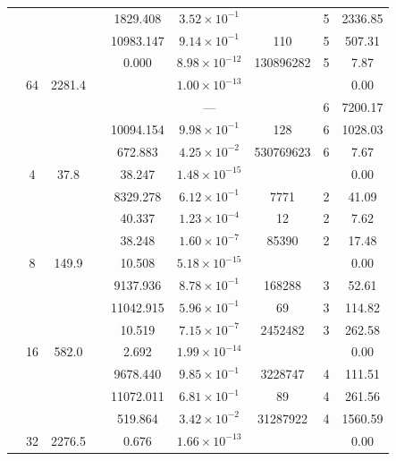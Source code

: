 \begin{table}[htbp]
\begin{tabular}{l S[table-format=3.0] S[table-format=4.1] l S[table-format=3.3] S[table-format=1.2e2] S[table-format=6.0] S[table-format=2.0] S[table-format=4.2]}
     &  &  &  & 1829.408 & $3.52 \times 10^{-1}$ & {\text{---}} & 5 & 2336.85 \\
     &  &  &  & 10983.147 & $9.14 \times 10^{-1}$ & 110 & 5 & 507.31 \\
     &  &  &  & 0.000 & $8.98 \times 10^{-12}$ & 130896282 & 5 & 7.87 \\
     & 64 & 2281.4 &  & {\text{---}} & $1.00 \times 10^{-13}$ & {\text{---}} & {\text{---}} & 0.00 \\
     &  &  &  & {\text{---}} & ${\text{---}}$ & {\text{---}} & 6 & 7200.17 \\
     &  &  &  & 10094.154 & $9.98 \times 10^{-1}$ & 128 & 6 & 1028.03 \\
     &  &  &  & 672.883 & $4.25 \times 10^{-2}$ & 530769623 & 6 & 7.67 \\
    \midrule
     & 4 & 37.8 &  & 38.247 & $1.48 \times 10^{-15}$ & {\text{---}} & {\text{---}} & 0.00 \\
     &  &  &  & 8329.278 & $6.12 \times 10^{-1}$ & 7771 & 2 & 41.09 \\
     &  &  &  & 40.337 & $1.23 \times 10^{-4}$ & 12 & 2 & 7.62 \\
     &  &  &  & 38.248 & $1.60 \times 10^{-7}$ & 85390 & 2 & 17.48 \\
     & 8 & 149.9 &  & 10.508 & $5.18 \times 10^{-15}$ & {\text{---}} & {\text{---}} & 0.00 \\
     &  &  &  & 9137.936 & $8.78 \times 10^{-1}$ & 168288 & 3 & 52.61 \\
     &  &  &  & 11042.915 & $5.96 \times 10^{-1}$ & 69 & 3 & 114.82 \\
     &  &  &  & 10.519 & $7.15 \times 10^{-7}$ & 2452482 & 3 & 262.58 \\
     & 16 & 582.0 &  & 2.692 & $1.99 \times 10^{-14}$ & {\text{---}} & {\text{---}} & 0.00 \\
     &  &  &  & 9678.440 & $9.85 \times 10^{-1}$ & 3228747 & 4 & 111.51 \\
     &  &  &  & 11072.011 & $6.81 \times 10^{-1}$ & 89 & 4 & 261.56 \\
     &  &  &  & 519.864 & $3.42 \times 10^{-2}$ & 31287922 & 4 & 1560.59 \\
     & 32 & 2276.5 &  & 0.676 & $1.66 \times 10^{-13}$ & {\text{---}} & {\text{---}} & 0.00 \\

\end{tabular}
\end{table}
